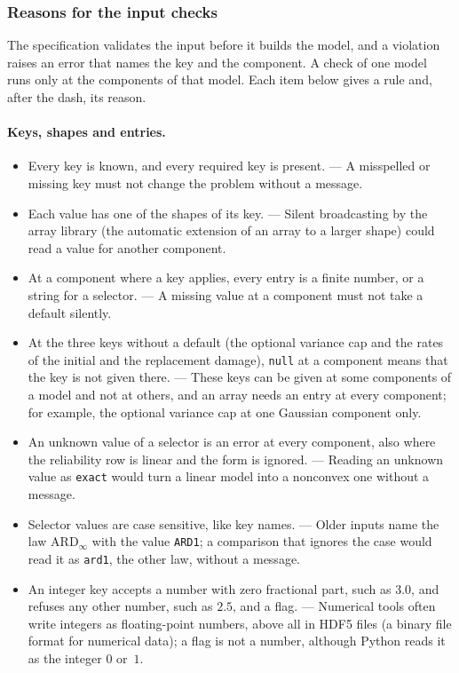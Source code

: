 \documentclass[11pt,a4paper]{article}
\theoremstyle{plain}
\theoremstyle{definition}
\theoremstyle{remark}
\begin{document}
\subsubsection{Reasons for the input checks}
\label{sec:check_reasons}

The specification validates the input before it builds the model, and a violation raises an error that names the key and the component.
A check of one model runs only at the components of that model.
Each item below gives a rule and, after the dash, its reason.

\paragraph{Keys, shapes and entries.}
\begin{itemize}
  \item Every key is known, and every required key is present. --- A misspelled or missing key must not change the problem without a message.
  \item Each value has one of the shapes of its key. --- Silent broadcasting by the array library (the automatic extension of an array to a larger shape) could read a value for another component.
  \item At a component where a key applies, every entry is a finite number, or a string for a selector. --- A missing value at a component must not take a default silently.
  \item At the three keys without a default (the optional variance cap and the rates of the initial and the replacement damage), \texttt{null} at a component means that the key is not given there. --- These keys can be given at some components of a model and not at others, and an array needs an entry at every component; for example, the optional variance cap at one Gaussian component only.
  \item An unknown value of a selector is an error at every component, also where the reliability row is linear and the form is ignored. --- Reading an unknown value as \texttt{exact} would turn a linear model into a nonconvex one without a message.
  \item Selector values are case sensitive, like key names. --- Older inputs name the law $\text{ARD}_\infty$ with the value \texttt{ARD1}; a comparison that ignores the case would read it as \texttt{ard1}, the other law, without a message.
  \item An integer key accepts a number with zero fractional part, such as $3.0$, and refuses any other number, such as $2.5$, and a flag. --- Numerical tools often write integers as floating-point numbers, above all in HDF5 files (a binary file format for numerical data); a flag is not a number, although Python reads it as the integer $0$ or~$1$.
\end{itemize}
\end{document}
